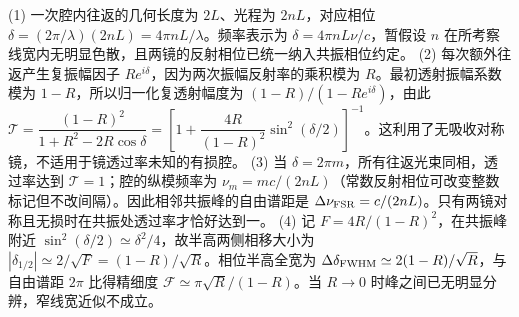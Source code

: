 (1) 一次腔内往返的几何长度为 \(2L\)、光程为 \(2nL\)，对应相位 \(\delta=(2\pi/\lambda)(2nL)=4\pi nL/\lambda\)。频率表示为 \(\delta=4\pi nL\nu/c\)，暂假设 \(n\) 在所考察线宽内无明显色散，且两镜的反射相位已统一纳入共振相位约定。
(2) 每次额外往返产生复振幅因子 \(Re^{i\delta}\)，因为两次振幅反射率的乘积模为 \(R\)。最初透射振幅系数模为 \(1-R\)，所以归一化复透射幅度为 \((1-R)/(1-Re^{i\delta})\)，由此 \(\mathcal T=\dfrac{(1-R)^2}{1+R^2-2R\cos\delta}=\left[1+\dfrac{4R}{(1-R)^2}\sin^2(\delta/2)\right]^{-1}\)。这利用了无吸收对称镜，不适用于镜透过率未知的有损腔。
(3) 当 \(\delta=2\pi m\)，所有往返光束同相，透过率达到 \(\mathcal T=1\)；腔的纵模频率为 \(\nu_m=mc/(2nL)\)（常数反射相位可改变整数标记但不改间隔）。因此相邻共振峰的自由谱距是 \(\Delta\nu_{\rm FSR}=c/(2nL)\)。只有两镜对称且无损时在共振处透过率才恰好达到一。
(4) 记 \(F=4R/(1-R)^2\)，在共振峰附近 \(\sin^2(\delta/2)\simeq\delta^2/4\)，故半高两侧相移大小为 \(|\delta_{1/2}|\simeq2/\sqrt F=(1-R)/\sqrt R\)。相位半高全宽为 \(\Delta\delta_{\rm FWHM}\simeq2(1-R)/\sqrt R\)，与自由谱距 \(2\pi\) 比得精细度 \(\mathcal F\simeq\pi\sqrt R/(1-R)\)。当 \(R\to0\) 时峰之间已无明显分辨，窄线宽近似不成立。
